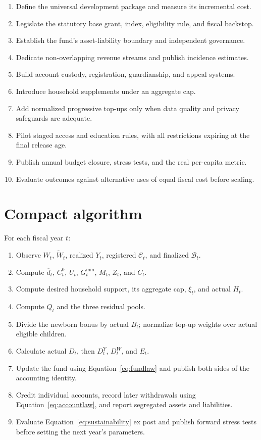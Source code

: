\documentclass[11pt]{article}
\begin{document}
\begin{enumerate}[label=\arabic*.]
  \item Define the universal development package and measure its incremental cost.
  \item Legislate the statutory base grant, index, eligibility rule, and fiscal backstop.
  \item Establish the fund's asset-liability boundary and independent governance.
  \item Dedicate non-overlapping revenue streams and publish incidence estimates.
  \item Build account custody, registration, guardianship, and appeal systems.
  \item Introduce household supplements under an aggregate cap.
  \item Add normalized progressive top-ups only when data quality and privacy safeguards
  are adequate.
  \item Pilot staged access and education rules, with all restrictions expiring at the
  final release age.
  \item Publish annual budget closure, stress tests, and the real per-capita metric.
  \item Evaluate outcomes against alternative uses of equal fiscal cost before scaling.
\end{enumerate}

\section{Compact algorithm}

For each fiscal year $t$:

\begin{enumerate}[label=\arabic*.]
  \item Observe $W_t$, $\widetilde W_t$, realized $Y_t$, registered $\mathcal C_t$, and
  finalized $\mathcal B_t$.
  \item Compute $\overline d_t$, $C_t^0$, $U_t$, $G_t^{\min}$, $M_t$, $Z_t$, and $C_t$.
  \item Compute desired household support, its aggregate cap, $\xi_t$, and actual $H_t$.
  \item Compute $Q_t$ and the three residual pools.
  \item Divide the newborn bonus by actual $B_t$; normalize top-up weights over actual
  eligible children.
  \item Calculate actual $D_t$, then $D_t^Y$, $D_t^W$, and $E_t$.
  \item Update the fund using Equation~\eqref{eq:fundlaw} and publish both sides of the
  accounting identity.
  \item Credit individual accounts, record later withdrawals using
  Equation~\eqref{eq:accountlaw}, and report segregated assets and liabilities.
  \item Evaluate Equation~\eqref{eq:sustainability} ex post and publish forward stress
  tests before setting the next year's parameters.
\end{enumerate}
\end{document}
